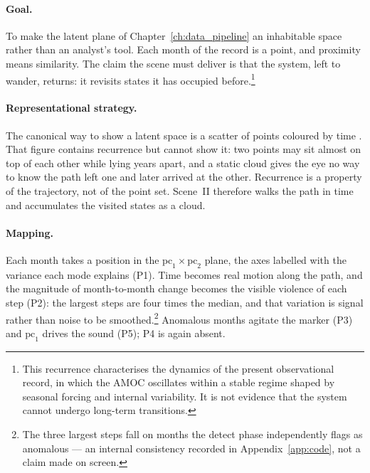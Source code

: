 \paragraph{Goal.} To make the latent plane of Chapter~\ref{ch:data_pipeline} an inhabitable space rather than an analyst's tool. Each month of the record is a point, and proximity means similarity. The claim the scene must deliver is that the system, left to wander, returns: it revisits states it has occupied before.\footnote{This recurrence characterises the dynamics of the present observational record, in which the AMOC oscillates within a stable regime shaped by seasonal forcing and internal variability. It is not evidence that the system cannot undergo long-term transitions.}

\paragraph{Representational strategy.} The canonical way to show a latent space is a scatter of points coloured by time \parencite{sacha2018}. That figure contains recurrence but cannot show it: two points may sit almost on top of each other while lying years apart, and a static cloud gives the eye no way to know the path left one and later arrived at the other. Recurrence is a property of the trajectory, not of the point set. Scene~II therefore walks the path in time and accumulates the visited states as a cloud.

\paragraph{Mapping.} Each month takes a position in the $\mathrm{pc}_1 \times \mathrm{pc}_2$ plane, the axes labelled with the variance each mode explains (P1). Time becomes real motion along the path, and the magnitude of month-to-month change becomes the visible violence of each step (P2): the largest steps are four times the median, and that variation is signal rather than noise to be smoothed.\footnote{The three largest steps fall on months the detect phase independently flags as anomalous --- an internal consistency recorded in Appendix~\ref{app:code}, not a claim made on screen.} Anomalous months agitate the marker (P3) and $\mathrm{pc}_1$ drives the sound (P5); P4 is again absent.

